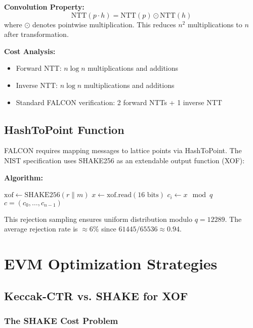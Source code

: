 \documentclass[11pt,a4paper]{article}
\begin{document}
\textbf{Convolution Property:}
\begin{equation}
\text{NTT}(p \cdot h) = \text{NTT}(p) \odot \text{NTT}(h)
\end{equation}
where $\odot$ denotes pointwise multiplication. This reduces $n^2$ multiplications to $n$ after transformation.

\textbf{Cost Analysis:}
\begin{itemize}
    \item Forward NTT: $n \log n$ multiplications and additions
    \item Inverse NTT: $n \log n$ multiplications and additions
    \item Standard FALCON verification: 2 forward NTTs + 1 inverse NTT
\end{itemize}

\subsection{HashToPoint Function}

FALCON requires mapping messages to lattice points via HashToPoint. The NIST specification uses SHAKE256 as an extendable output function (XOF):

\textbf{Algorithm:}
\begin{algorithmic}[1]
\STATE $\text{xof} \gets \text{SHAKE256}(r \| m)$
    \REPEAT
        \STATE $x \gets \text{xof.read}(16 \text{ bits})$
    \STATE $c_i \gets x \mod q$
\ENDFOR
\RETURN $c = (c_0, \ldots, c_{n-1})$
\end{algorithmic}

This rejection sampling ensures uniform distribution modulo $q = 12289$. The average rejection rate is $\approx 6\%$ since $61445/65536 \approx 0.94$.

\section{EVM Optimization Strategies}

\subsection{Keccak-CTR vs. SHAKE for XOF}

\subsubsection{The SHAKE Cost Problem}
\end{document}
